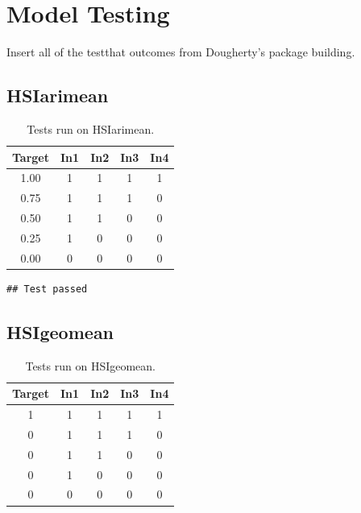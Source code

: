 \documentclass[
]{book}
\begin{document}
\hypertarget{model-testing}{%
\chapter{Model Testing}\label{model-testing}}

{Insert all of the testthat outcomes from Dougherty's package building.}

\hypertarget{hsiarimean}{%
\section{HSIarimean}\label{hsiarimean}}

\begin{table}

\caption{\label{tab:unnamed-chunk-29}Tests run on HSIarimean.}
\centering
\begin{tabular}[t]{c|c|c|c|c}
\hline
Target & In1 & In2 & In3 & In4\\
\hline
1.00 & 1 & 1 & 1 & 1\\
\hline
0.75 & 1 & 1 & 1 & 0\\
\hline
0.50 & 1 & 1 & 0 & 0\\
\hline
0.25 & 1 & 0 & 0 & 0\\
\hline
0.00 & 0 & 0 & 0 & 0\\
\hline
\end{tabular}
\end{table}

\begin{verbatim}
## Test passed
\end{verbatim}

\hypertarget{hsigeomean}{%
\section{HSIgeomean}\label{hsigeomean}}

\begin{table}

\caption{\label{tab:unnamed-chunk-30}Tests run on HSIgeomean.}
\centering
\begin{tabular}[t]{c|c|c|c|c}
\hline
Target & In1 & In2 & In3 & In4\\
\hline
1 & 1 & 1 & 1 & 1\\
\hline
0 & 1 & 1 & 1 & 0\\
\hline
0 & 1 & 1 & 0 & 0\\
\hline
0 & 1 & 0 & 0 & 0\\
\hline
0 & 0 & 0 & 0 & 0\\
\hline
\end{tabular}
\end{table}
\end{document}
